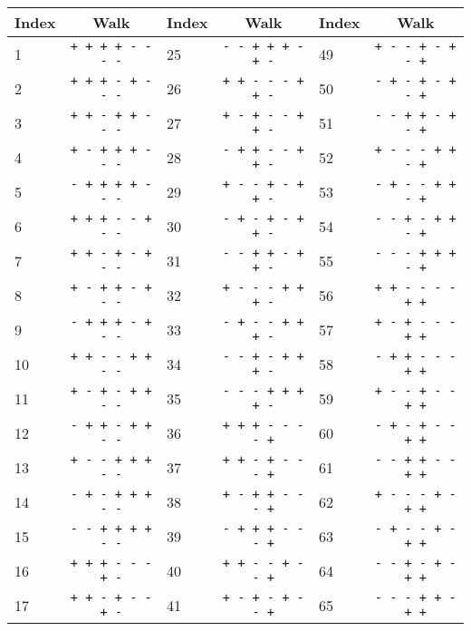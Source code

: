 \documentclass[fullpage,12pt,fleqn]{article}
\begin{document}
\begin{table}[htbp]

\center

\begin{tabular}{lc|lc|lc}
 Index & Walk & Index & Walk & Index & Walk \\ \hline
 1 &  \verb!+ + + + - - - -! & 25  &  \verb!- - + + + - + -! & 49 &
\verb!+ - - + - + - +! \\
 2 &  \verb!+ + + - + - - -! & 26  &  \verb!+ + - - - + + -!    & 50 &
\verb!- + - + - + - +! \\
 3 &  \verb!+ + - + + - - -! & 27  &  \verb!+ - + - - + + -!    & 51 &
\verb!- - + + - + - +! \\
 4 &  \verb!+ - + + + - - -! & 28  &  \verb!- + + - - + + -!    & 52 &
\verb!+ - - - + + - +! \\
 5 &  \verb!- + + + + - - -! & 29  &  \verb!+ - - + - + + -!    & 53 &
\verb!- + - - + + - +! \\
 6 &  \verb!+ + + - - + - -! & 30  &  \verb!- + - + - + + -!    & 54 &
\verb!- - + - + + - +! \\
 7 &  \verb!+ + - + - + - -! & 31  &  \verb!- - + + - + + -!    & 55 &
\verb!- - - + + + - +! \\
 8 &  \verb!+ - + + - + - -! & 32  &  \verb!+ - - - + + + -!    & 56 &
\verb!+ + - - - - + +! \\
 9 &  \verb!- + + + - + - -! & 33  &  \verb!- + - - + + + -!    & 57 &
\verb!+ - + - - - + +! \\
10 &  \verb!+ + - - + + - -! & 34  &  \verb!- - + - + + + -!    & 58 &
\verb!- + + - - - + +! \\
11 &  \verb!+ - + - + + - -! & 35  &  \verb!- - - + + + + -!    & 59 &
\verb!+ - - + - - + +! \\
12 &  \verb!- + + - + + - -! & 36  &  \verb!+ + + - - - - +!    & 60 &
\verb!- + - + - - + +! \\
13 &  \verb!+ - - + + + - -! & 37  &  \verb!+ + - + - - - +!    & 61 &
\verb!- - + + - - + +! \\
14 &  \verb!- + - + + + - -! & 38  &  \verb!+ - + + - - - +!    & 62 &
\verb!+ - - - + - + +! \\
15 &  \verb!- - + + + + - -! & 39  &  \verb!- + + + - - - +!    & 63 &
\verb!- + - - + - + +! \\
16 &  \verb!+ + + - - - + -! & 40  &  \verb!+ + - - + - - +!    & 64 &
\verb!- - + - + - + +! \\
17 &  \verb!+ + - + - - + -! & 41  &  \verb!+ - + - + - - +!    & 65 &
\verb!- - - + + - + +! \\

\end{tabular}
\end{table}
\end{document}
